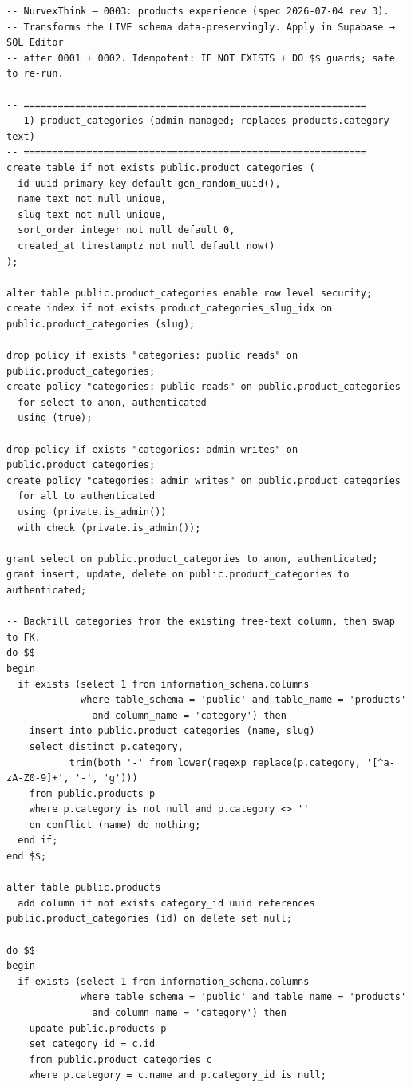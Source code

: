 \documentclass[11pt,a4paper]{article}
\begin{document}
\begin{lstlisting}
-- NurvexThink — 0003: products experience (spec 2026-07-04 rev 3).
-- Transforms the LIVE schema data-preservingly. Apply in Supabase → SQL Editor
-- after 0001 + 0002. Idempotent: IF NOT EXISTS + DO $$ guards; safe to re-run.

-- ============================================================
-- 1) product_categories (admin-managed; replaces products.category text)
-- ============================================================
create table if not exists public.product_categories (
  id uuid primary key default gen_random_uuid(),
  name text not null unique,
  slug text not null unique,
  sort_order integer not null default 0,
  created_at timestamptz not null default now()
);

alter table public.product_categories enable row level security;
create index if not exists product_categories_slug_idx on public.product_categories (slug);

drop policy if exists "categories: public reads" on public.product_categories;
create policy "categories: public reads" on public.product_categories
  for select to anon, authenticated
  using (true);

drop policy if exists "categories: admin writes" on public.product_categories;
create policy "categories: admin writes" on public.product_categories
  for all to authenticated
  using (private.is_admin())
  with check (private.is_admin());

grant select on public.product_categories to anon, authenticated;
grant insert, update, delete on public.product_categories to authenticated;

-- Backfill categories from the existing free-text column, then swap to FK.
do $$
begin
  if exists (select 1 from information_schema.columns
             where table_schema = 'public' and table_name = 'products'
               and column_name = 'category') then
    insert into public.product_categories (name, slug)
    select distinct p.category,
           trim(both '-' from lower(regexp_replace(p.category, '[^a-zA-Z0-9]+', '-', 'g')))
    from public.products p
    where p.category is not null and p.category <> ''
    on conflict (name) do nothing;
  end if;
end $$;

alter table public.products
  add column if not exists category_id uuid references public.product_categories (id) on delete set null;

do $$
begin
  if exists (select 1 from information_schema.columns
             where table_schema = 'public' and table_name = 'products'
               and column_name = 'category') then
    update public.products p
    set category_id = c.id
    from public.product_categories c
    where p.category = c.name and p.category_id is null;


\end{lstlisting}
\end{document}
